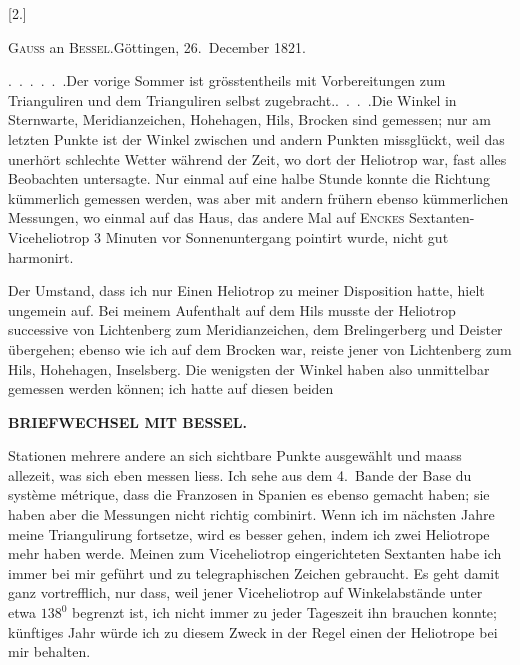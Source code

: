 \begin{center}
[2.]\par\medskip
\textsc{Gauss} an \textsc{Bessel}.\quad Göttingen, 26.~December 1821.
\end{center}

\par\noindent\hspace*{\parindent}.\ .\ .\ .\ .\ .\quad Der vorige Sommer ist grösstentheils mit Vorbereitungen zum Trianguliren und dem Trianguliren selbst zugebracht.\quad.\ .\ .\ .\quad Die Winkel in Sternwarte, Meridianzeichen, Hohehagen, Hils, Brocken sind gemessen; nur am letzten Punkte ist der Winkel zwischen  und andern Punkten missglückt, weil das unerhört schlechte Wetter während der Zeit, wo dort der Heliotrop war, fast alles Beobachten untersagte.
Nur einmal auf eine halbe Stunde konnte die Richtung kümmerlich gemessen werden, was aber mit andern frühern ebenso kümmerlichen Messungen, wo einmal auf das Haus, das andere Mal auf \textsc{Enckes} Sextanten-Viceheliotrop 3 Minuten vor Sonnenuntergang pointirt wurde, nicht gut harmonirt.

\par\noindent\hspace*{\parindent}Der Umstand, dass ich nur Einen Heliotrop zu meiner Disposition hatte, hielt ungemein auf.
Bei meinem Aufenthalt auf dem Hils musste der Heliotrop successive von Lichtenberg zum Meridianzeichen, dem Brelingerberg und Deister übergehen; ebenso wie ich auf dem Brocken war, reiste jener von Lichtenberg zum Hils, Hohehagen, Inselsberg.
Die wenigsten der Winkel haben also unmittelbar gemessen werden können; ich hatte auf diesen beiden
\par\clearpage
{}\hfill{\small\textbf{BRIEFWECHSEL MIT BESSEL.}}\par\medskip
\noindent Stationen mehrere andere an sich sichtbare Punkte ausgewählt und maass allezeit, was sich eben messen liess.
Ich sehe aus dem 4.~Bande der Base du système métrique, dass die Franzosen in Spanien es ebenso gemacht haben; sie haben aber die Messungen nicht richtig combinirt.
Wenn ich im nächsten Jahre meine Triangulirung fortsetze, wird es besser gehen, indem ich zwei Heliotrope mehr haben werde.
Meinen zum Viceheliotrop eingerichteten Sextanten habe ich immer bei mir geführt und zu telegraphischen Zeichen gebraucht.
Es geht damit ganz vortrefflich, nur dass, weil jener Viceheliotrop auf Winkelabstände unter etwa \(138^{0}\) begrenzt ist, ich nicht immer zu jeder Tageszeit ihn brauchen konnte; künftiges Jahr würde ich zu diesem Zweck in der Regel einen der Heliotrope bei mir behalten.

